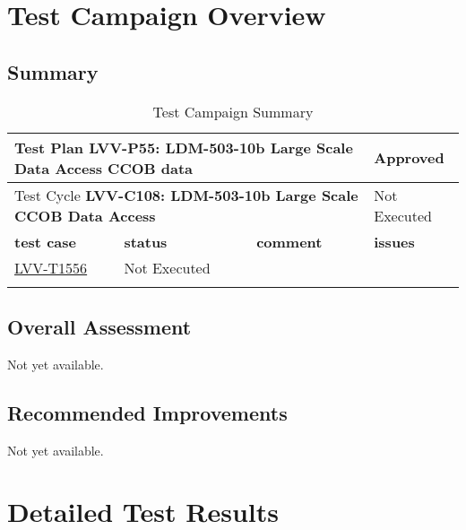 \documentclass[DM,lsstdraft,STR,toc]{lsstdoc}
\begin{document}
\newpage

\section{Test Campaign Overview}
\label{sect:overview}

\subsection{Summary}
\label{sect:summarytable}

\begin{longtable}{p{2cm}p{2.5cm}p{9cm}p{2.5cm}}
\toprule
\multicolumn{3}{p{13.5cm}}{ Test Plan {\bf LVV-P55: LDM-503-10b Large Scale Data Access CCOB data }} & Approved \\\hline

  \multicolumn{3}{p{13.5cm}}{ Test Cycle {\bf LVV-C108: LDM-503-10b Large Scale CCOB Data Access }} & Not Executed \\\hline

  {\bf \footnotesize test case} & {\bf \footnotesize status} & {\bf \footnotesize comment} & {\bf \footnotesize issues} \\\toprule

\href{https://jira.lsstcorp.org/secure/Tests.jspa#/testCase/LVV-T1556}{LVV-T1556}
    & Not Executed &
    \begin{minipage}[]{9cm}
    \smallskip
    
    \medskip
    \end{minipage}
    &
    \\\hline
\caption{Test Campaign Summary}
\label{table:summary}
\end{longtable}

\subsection{Overall Assessment}
\label{sect:overallassessment}

Not yet available.

\subsection{Recommended Improvements}
\label{sect:recommendations}

Not yet available.

\newpage
\section{Detailed Test Results}
\label{sect:detailedtestresults}
\end{document}
